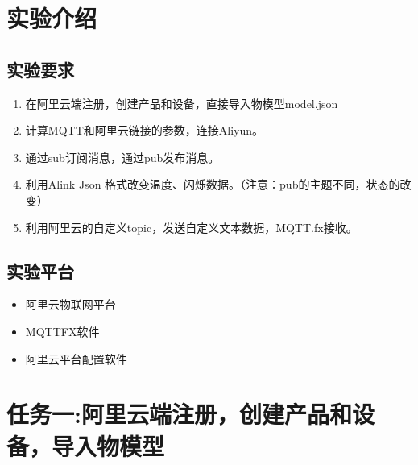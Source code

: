 \documentclass[12pt,hyperref,a4paper,UTF8]{ctexart}
\begin{document}
\cover

%
%

\thispagestyle{empty} %

\newpage
\tableofcontents

\newpage


\section{实验介绍}
\subsection{实验要求}

\begin{enumerate}[itemsep=-5pt, topsep=0pt, partopsep=0pt]
    \item 在阿里云端注册，创建产品和设备，直接导入物模型model.json 
    \item 计算MQTT和阿里云链接的参数，连接Aliyun。
    \item 通过sub订阅消息，通过pub发布消息。 
    \item 利用Alink Json 格式改变温度、闪烁数据。（注意：pub的主题不同，状态的改变）
    \item 利用阿里云的自定义topic，发送自定义文本数据，MQTT.fx接收。
\end{enumerate}
\subsection{实验平台}
\begin{itemize}[itemsep=-5pt, topsep=0pt, partopsep=0pt]
    \item 阿里云物联网平台
    \item MQTTFX软件
    \item 阿里云平台配置软件
\end{itemize}


\section{任务一:阿里云端注册，创建产品和设备，导入物模型}
\end{document}
